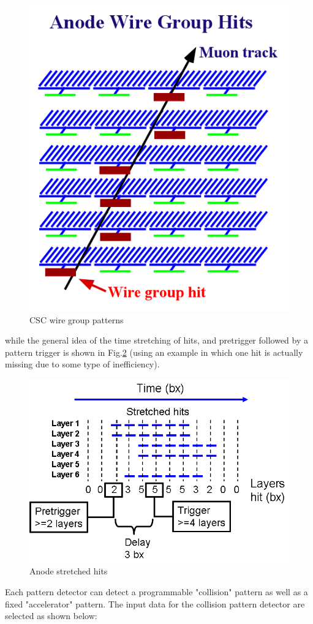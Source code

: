 \begin{figure}[tbh]
        \begin{center}
                \includegraphics[width=0.48\linewidth]{figures/anode_wire_group_hits.png}
                \caption{CSC wire group patterns}
                \label{fig:anode_wire_group_hits}
        \end{center}
\end{figure}

while the general idea of the time stretching of hits, and pretrigger followed by a pattern trigger is shown in Fig.\ref{fig:anode_stretched_hits} (using an example in which one hit is actually missing due to some type of inefficiency).

\begin{figure}[tbh]
        \begin{center}
                \includegraphics[width=0.73\linewidth]{figures/anode_stretched_hits.png}
                \caption{Anode stretched hits}
                \label{fig:anode_stretched_hits}
        \end{center}
\end{figure}

Each pattern detector can detect a programmable "collision" pattern as well as a fixed "accelerator" pattern. The input data for the collision pattern detector are selected as shown below:

